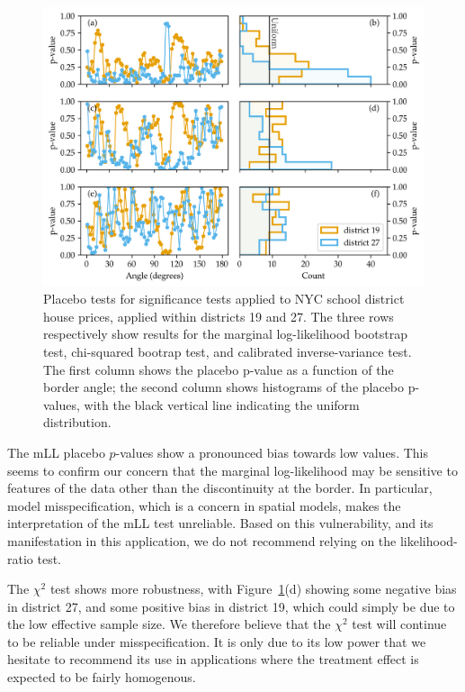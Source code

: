 \documentclass[letter,12pt]{article}
\begin{document}
\begin{figure}[tbp]
    \centering
    \includegraphics[width=\textwidth,height=0.4\textheight,keepaspectratio]{../NYC/NYC_plots/NYC_placebos.png}
    \caption{\label{fig:nyc_placebos} Placebo tests for significance tests applied to NYC school district house prices, applied within districts 19 and 27. The three rows respectively show results for the marginal log-likelihood bootstrap test, chi-squared bootrap test, and calibrated inverse-variance test. The first column shows the placebo p-value as a function of the border angle; the second column shows histograms of the placebo p-values, with the black vertical line indicating the uniform distribution.}
\end{figure}

The mLL placebo \(p\)-values show a pronounced bias towards low values.
This seems to confirm our concern that the marginal log-likelihood may be sensitive to features of the data other than the discontinuity at the border.
In particular, model misspecification, which is a concern in spatial models, makes the interpretation of the mLL test unreliable.
Based on this vulnerability, and its manifestation in this application, we do not recommend relying on the likelihood-ratio test.

The \(\chi^2\) test shows more robustness, with Figure~\ref{fig:nyc_placebos}(d) showing some negative bias in district 27, and some positive bias in district 19, which could simply be due to the low effective sample size.
We therefore believe that the \(\chi^2\) test will continue to be reliable under misspecification.
It is only due to its low power that we hesitate to recommend its use in applications where the treatment effect is expected to be fairly homogenous.
\end{document}

